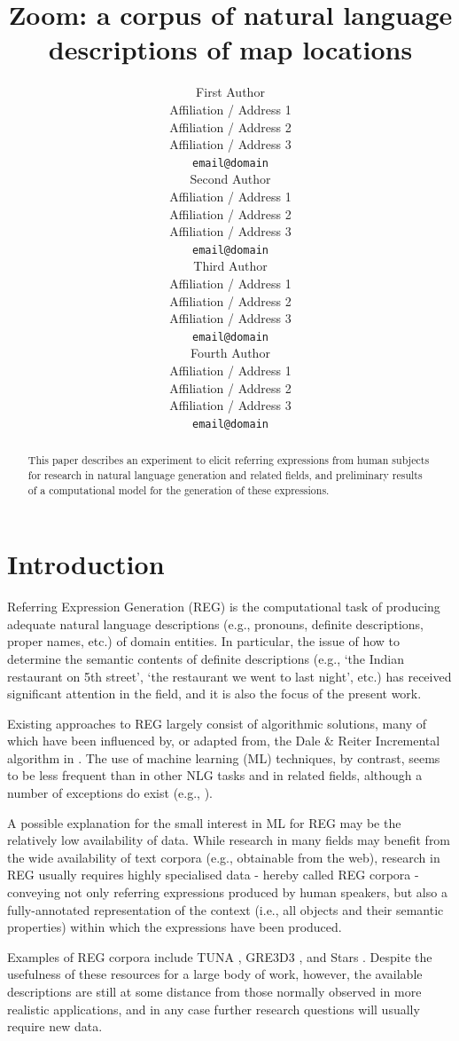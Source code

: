 \documentclass[11pt]{article}
\title{Zoom: a corpus of natural language descriptions of map locations}
\author{
	First Author \\
  Affiliation / Address 1 \\
  Affiliation / Address 2 \\
  Affiliation / Address 3 \\
  {\tt email@domain} \\
	\And
  Second Author \\
  Affiliation / Address 1 \\
  Affiliation / Address 2 \\
  Affiliation / Address 3 \\
  {\tt email@domain} \\
	\And
  Third Author \\
  Affiliation / Address 1 \\
  Affiliation / Address 2 \\
  Affiliation / Address 3 \\
  {\tt email@domain} \\
	\And
  Fourth Author \\
  Affiliation / Address 1 \\
  Affiliation / Address 2 \\
  Affiliation / Address 3 \\
  {\tt email@domain} \\
}
\date{}
\begin{document}
\raggedbottom

\maketitle

\begin{abstract}
This paper describes 
an experiment  to elicit referring expressions
from human subjects 
for research in natural language generation and related fields,
and preliminary results of a computational model 
for the generation of these expressions.
\end{abstract}


\section{Introduction}

Referring Expression Generation (REG) is the computational task of producing adequate natural language descriptions (e.g., pronouns, definite descriptions, proper names, etc.) of domain entities. In particular, the issue of how to determine the semantic contents of definite descriptions (e.g., `the Indian restaurant on 5th street', `the restaurant we went to last night',  etc.) has received significant attention in the field, and it is also the focus of the present work.

Existing approaches to REG largely consist of algorithmic solutions, many of which have been influenced by, or adapted from, the Dale \& Reiter Incremental algorithm in \cite{incremental}. The use of machine learning (ML) techniques, by contrast, seems to be less frequent than in other NLG tasks and in related fields, although a number of exceptions do exist (e.g., \cite{jordan,speaker-dependent,viethen-phd,garoufi13,thiago-svm}). 

A possible explanation for the small interest in ML for REG may be the relatively low availability of data. While research in many fields may benefit from the wide availability of text corpora (e.g., obtainable from the web), research in REG usually requires highly specialised data  - hereby called REG corpora - conveying not only referring expressions produced by human speakers, but also a fully-annotated representation of the context (i.e., all objects and their semantic properties) within which the expressions have been produced. 

Examples of REG corpora include TUNA \cite{tuna-corpus}, GRE3D3 \cite{gre3d3}, and Stars \cite{stars-mutual-disamb}. Despite the usefulness of these resources for a large body of work, however, the available descriptions are still at some distance from those normally observed in more realistic applications, and in any case further research questions will usually require new data. 
\end{document}
